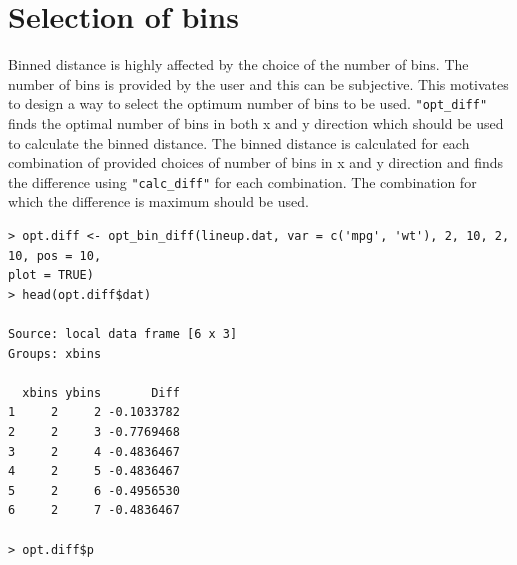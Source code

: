 \section{Selection of bins}\label{select-bins}

Binned distance is highly affected by the choice of the number of bins.
The number of bins is provided by the user and this can be subjective.
This motivates to design a way to select the optimum number of bins to
be used. \texttt{"opt\_diff"} finds the optimal number of bins in both x
and y direction which should be used to calculate the binned distance.
The binned distance is calculated for each combination of provided
choices of number of bins in x and y direction and finds the difference
using \texttt{"calc\_diff"} for each combination. The combination for
which the difference is maximum should be used.

%
%

\begin{verbatim}
> opt.diff <- opt_bin_diff(lineup.dat, var = c('mpg', 'wt'), 2, 10, 2, 10, pos = 10, 
plot = TRUE)
> head(opt.diff$dat)

Source: local data frame [6 x 3]
Groups: xbins

  xbins ybins       Diff
1     2     2 -0.1033782
2     2     3 -0.7769468
3     2     4 -0.4836467
4     2     5 -0.4836467
5     2     6 -0.4956530
6     2     7 -0.4836467

> opt.diff$p
\end{verbatim}

